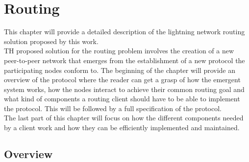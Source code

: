 \section{Routing}

This chapter will provide a detailed description of the lightning network routing solution proposed by this work. \\
TH proposed solution for the routing problem involves the creation of a new peer-to-peer network that emerges from the establishment of a new protocol the participating nodes conform to. The beginning of the chapter will provide an overview of the protocol where the reader can get a grasp of how the emergent system works, how the nodes interact to achieve their common routing goal and what kind of components a routing client should have to be able to implement the protocol. This will be followed by a full specification of the protocol. \\
The last part of this chapter will focus on how the different components needed by a client work and how they can be efficiently implemented and maintained.

\subsection{Overview}

